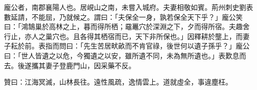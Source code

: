 \begin{pinyinscope}
龐公者，南郡襄陽人也。居峴山之南，未嘗入城府。夫妻相敬如賓。荊州刺史劉表數延請，不能屈，乃就候之。謂曰：「夫保全一身，孰若保全天下乎？」龐公笑曰：「鴻鵠巢於高林之上，暮而得所栖；黿鼉穴於深淵之下，夕而得所宿。夫趣舍行止，亦人之巢穴也。且各得其栖宿而已，天下非所保也。」因釋耕於壟上，而妻子耘於前。表指而問曰：「先生苦居畎畝而不肯官祿，後世何以遺子孫乎？」龐公曰：「世人皆遺之以危，今獨遺之以安，雖所遺不同，未為無所遺也。」表歎息而去。後遂攜其妻子登鹿門山，因采藥不反。

贊曰：江海冥滅，山林長往。遠性風疏，逸情雲上。道就虛全，事違塵枉。


\end{pinyinscope}